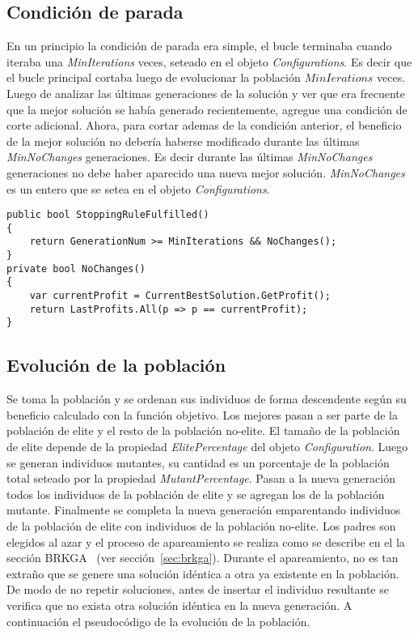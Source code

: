 \subsection{Condición de parada}

En un principio la condición de parada era simple, el bucle terminaba cuando iteraba una \textit{MinIterations} veces, seteado en el objeto \textit{Configurations}. Es decir que el bucle principal cortaba luego de evolucionar la población $MinIerations$ veces. Luego de analizar las últimas generaciones de la solución y ver que era frecuente que la mejor solución se había generado recientemente, agregue una condición de corte adicional. Ahora, para cortar ademas de la condición anterior, el beneficio de la mejor solución no debería haberse modificado durante las últimas \textit{MinNoChanges} generaciones. Es decir durante las últimas \textit{MinNoChanges} generaciones no debe haber aparecido una nueva mejor solución. \textit{MinNoChanges} es un entero que se setea en el objeto \textit{Configurations}.

\bigskip

\begin{minipage}{\textwidth}
\begin{lstlisting} 
public bool StoppingRuleFulfilled()
{ 
    return GenerationNum >= MinIterations && NoChanges();
}
private bool NoChanges()
{
	var currentProfit = CurrentBestSolution.GetProfit();
	return LastProfits.All(p => p == currentProfit);
}
\end{lstlisting}
\end{minipage}

\subsection{Evolución de la población}

Se toma la población y se ordenan sus individuos de forma descendente según su beneficio calculado con la función objetivo. Los mejores pasan a ser parte de la población de elite y el resto de la población no-elite. El tamaño de la población de elite depende de la propiedad \textit{ElitePercentage} del objeto \textit{Configuration}. Luego se generan individuos mutantes, su cantidad es un porcentaje de la población total seteado por la propiedad \textit{MutantPercentage}. Pasan a la nueva generación todos los individuos de la población de elite y se agregan los de la población mutante. Finalmente se completa la nueva generación emparentando individuos de la población de elite con individuos de la población no-elite. Los padres son elegidos al azar y el proceso de apareamiento se realiza como se describe en el la sección BRKGA ~(ver sección~\ref{sec:brkga}). Durante el apareamiento, no es tan extraño que se genere una solución idéntica a otra ya existente en la población. De modo de no repetir soluciones, antes de insertar el individuo resultante se verifica que no exista otra solución idéntica en la nueva generación. A continuación el pseudocódigo de la evolución de la población.

